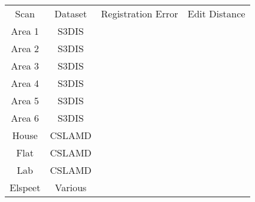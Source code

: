 \begin{tabular}{ c c c c }
    Scan & Dataset & Registration Error & Edit Distance \\ 
    Area 1 & S3DIS &  &  \\  
    Area 2 & S3DIS &  &  \\
    Area 3 & S3DIS &  &  \\
    Area 4 & S3DIS &  &  \\
    Area 5 & S3DIS &  &  \\
    Area 6 & S3DIS &  &  \\

    House & CSLAMD &  &  \\
    Flat & CSLAMD &  &  \\
    Lab & CSLAMD &  &  \\

    Elspeet & Various &  &  \\

\end{tabular}
